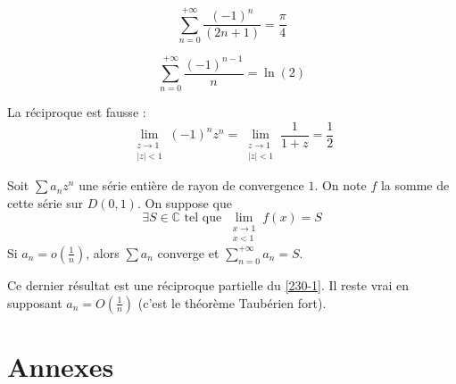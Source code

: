   \begin{application}
    \[ \sum_{n=0}^{+\infty} \frac{(-1)^n}{(2n+1)} = \frac{\pi}{4} \]
  \end{application}

  \begin{application}
    \[ \sum_{n=0}^{+\infty} \frac{(-1)^{n-1}}{n} = \ln(2) \]
  \end{application}

  \begin{cexample}
    La réciproque est fausse :
    \[ \lim_{\substack{z \rightarrow 1 \\ \vert z \vert < 1}} (-1)^n z^n = \lim_{\substack{z \rightarrow 1 \\ \vert z \vert < 1}} \frac{1}{1+z} = \frac{1}{2} \]
  \end{cexample}

  \begin{theorem}
    Soit $\sum a_n z^n$ une série entière de rayon de convergence $1$. On note $f$ la somme de cette série sur $D(0,1)$. On suppose que
    \[ \exists S \in \mathbb{C} \text{ tel que } \lim_{\substack{x \rightarrow 1 \\ x < 1}} f(x) = S \]
    Si $a_n = o \left( \frac{1}{n} \right)$, alors $\sum a_n$ converge et $\sum_{n=0}^{+\infty} a_n = S$.
  \end{theorem}

  \begin{remark}
    Ce dernier résultat est une réciproque partielle du \cref{230-1}. Il reste vrai en supposant $a_n = O \left( \frac{1}{n} \right)$ (c'est le théorème Taubérien fort).
  \end{remark}

  \newpage
  \section*{Annexes}


